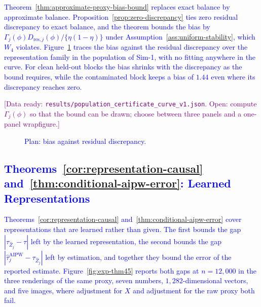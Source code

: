 \textcolor{blue}{Theorem~\ref{thm:approximate-proxy-bias-bound} replaces exact balance by approximate balance. Proposition~\ref{prop:zero-discrepancy} ties zero residual discrepancy to exact balance, and the theorem bounds the bias by $\Gamma_j(\phi)D_{\mathrm{res},j}(\phi)/\{\eta(1-\eta)\}$ under Assumption~\ref{ass:uniform-stability}, which $W_4$ violates. Figure~\ref{fig:exp-thm3} traces the bias against the residual discrepancy over the representation family in the population of Sim-1, with no fitting anywhere in the curve. For clean held-out blocks the bias shrinks with the discrepancy as the bound requires, while the contaminated block keeps a bias of $1.44$ even where its discrepancy reaches zero.}

\textcolor{purple}{[Data ready: \texttt{results/population\_certificate\_curve\_v1.json}. Open: compute $\Gamma_j(\phi)$ so that the bound can be drawn; choose between three panels and a one-panel wrapfigure.]}

\begin{figure}[t]
\centering
{}
\caption{\textcolor{blue}{Plan: bias against residual discrepancy.}}
\label{fig:exp-thm3}
\end{figure}

\subsection{\texorpdfstring{\textcolor{blue}{Theorems~\ref{cor:representation-causal} and~\ref{thm:conditional-aipw-error}: Learned Representations}}{Theorems 4 and 5: Learned Representations}}
\label{sec:exp-thm45}

\textcolor{blue}{Theorems~\ref{cor:representation-causal} and~\ref{thm:conditional-aipw-error} cover representations that are learned rather than given. The first bounds the gap $|\tau_{\widehat Z_j}-\tau|$ left by the learned representation, the second bounds the gap $|\widehat\tau_j^{\mathrm{AIPW}}-\tau_{\widehat Z_j}|$ left by estimation, and together they bound the error of the reported estimate. Figure~\ref{fig:exp-thm45} reports both gaps at $n=12{,}000$ in the three renderings of the same proxy, seven numbers, $1{,}282$-dimensional vectors, and five images, where adjustment for $X$ and adjustment for the raw proxy both fail.}

